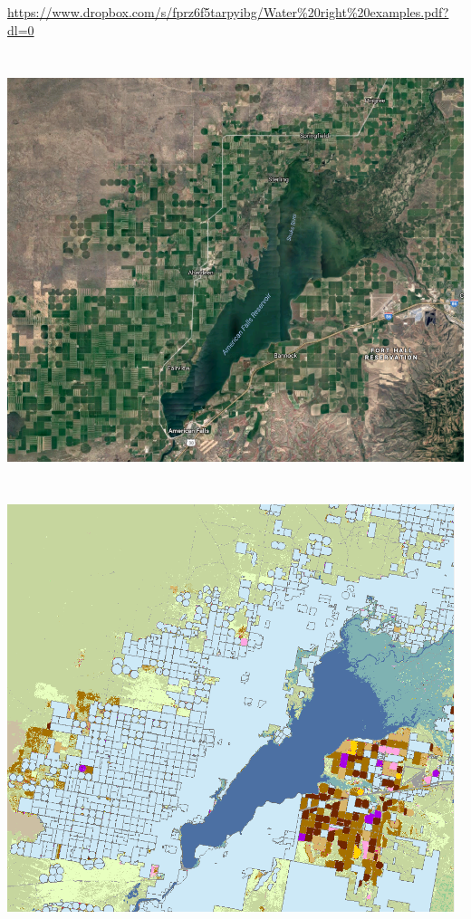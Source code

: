 \documentclass[]{article}
\begin{document}
\url{https://www.dropbox.com/s/fprz6f5tarpyibg/Water\%20right\%20examples.pdf?dl=0}

\hypertarget{section-33}{%
\subsection{}\label{section-33}}

\includegraphics[width=\textwidth,height=4.6875in]{figures/m10_googleearth.png}

\hypertarget{section-34}{%
\subsection{}\label{section-34}}

\includegraphics[width=\textwidth,height=4.6875in]{figures/m10_water_rights.png}
\end{document}
